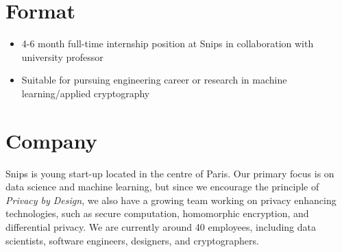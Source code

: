 \documentclass{article}
\begin{document}
\section*{Format}
\begin{itemize}
\item 4-6 month full-time internship position at Snips in collaboration with university professor
\item Suitable for pursuing engineering career or research in machine learning/applied cryptography
\end{itemize}

\section*{Company}
Snips is young start-up located in the centre of Paris. Our primary focus is on data science and machine learning, but since we encourage the principle of \emph{Privacy by Design}, we also have a growing team working on privacy enhancing technologies, such as secure computation, homomorphic encryption, and differential privacy. We are currently around 40 employees, including data scientists, software engineers, designers, and cryptographers.
\end{document}
